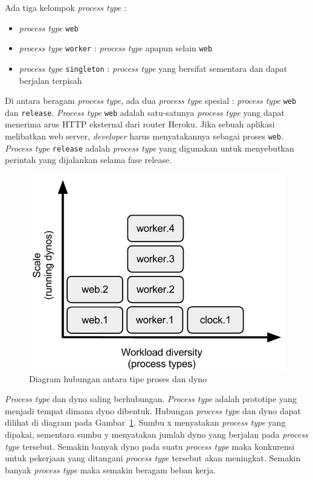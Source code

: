 \documentclass[a4paper,twoside]{article}
\begin{document}
\begin{enumerate}
\begin{enumerate}
\begin{itemize}
				Ada tiga kelompok \textit{process type} : 
\begin{itemize}
\item \textit{process type} \texttt{web}
\item \textit{process type} \texttt{worker} : \textit{process type} apapun selain \texttt{web}
\item \textit{process type} \texttt{singleton} : \textit{process type} yang bersifat sementara dan dapat berjalan terpisah
\end{itemize}

Di antara beragam \textit{process type}, ada dua \textit{process type} spesial : \textit{process type} \texttt{web} dan \texttt{release}. \textit{Process type} \texttt{web} adalah satu-satunya \textit{process type} yang dapat menerima arus HTTP eksternal dari router Heroku. Jika sebuah aplikasi melibatkan web server, \textit{developer} harus menyatakannya sebagai proses \texttt{web}. \textit{Process type} \texttt{release} adalah \textit{process type} yang digunakan untuk menyebutkan perintah yang dijalankan selama fase release.

\begin{figure}[H]
	\centering  
	\includegraphics[scale=0.4]{Gambar/process-type-dyno-relationship.jpg}  
	\caption[Diagram hubungan antara tipe proses dan dyno]{Diagram hubungan antara tipe proses dan dyno} 
	\label{fig:process-type-dyno-relationship} 
\end{figure}

\textit{Process type} dan dyno saling berhubungan. \textit{Process type} adalah prototipe yang menjadi tempat dimana dyno dibentuk. Hubungan \textit{process type} dan dyno dapat dilihat di diagram pada Gambar~\ref{fig:process-type-dyno-relationship}. Sumbu x menyatakan \textit{process type} yang dipakai, sementara sumbu y menyatakan jumlah dyno yang berjalan pada \textit{process type} tersebut. Semakin banyak dyno pada suatu \textit{process type} maka konkurensi untuk pekerjaan yang ditangani \textit{process type} tersebut akan meningkat. Semakin banyak \textit{process type} maka semakin beragam beban kerja.


\end{itemize}
\end{enumerate}
\end{enumerate}
\end{document}
